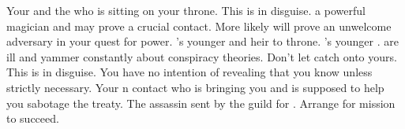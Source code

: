 \documentclass[char]{NeptuneBall}
\begin{document}
\begin{contacts}
  \contact{\cKing{}} Your \cKing{\nephew} and the \cKing{\mer} who is sitting on your throne.
  \contact{\cWitch{}} This is \cWitch{} in disguise. \cWitch{\They} \cWitch{\are} a powerful magician and may prove a crucial contact. More likely \cWitch{\they} will prove an unwelcome adversary in your quest for power.
  \contact{\cPrincess{}} \cKing{}'s younger \cPrincess{\offspring} and heir to \cKing{\their} throne.
  \contact{\cPlant{}} \cKing{}'s younger \cPlant{\sibling}. \cPlant{\they} are ill and yammer constantly about conspiracy theories. Don't let \cPlant{\them} catch onto yours.
  \contact{\cQueen{}} This is \cQueen{} in disguise. You have no intention of revealing that you know \cQueen{\them} unless strictly necessary.
  \contact{\cSpy{}} Your \pPacifica{}n contact who is bringing you \iHemlock{} and is supposed to help you sabotage the treaty.
	\contact{\cDiplomat{}} The assassin sent by the guild for \cQueen{}. Arrange for \cDiplomat{\their} mission to succeed.
\end{contacts}
\end{document}
